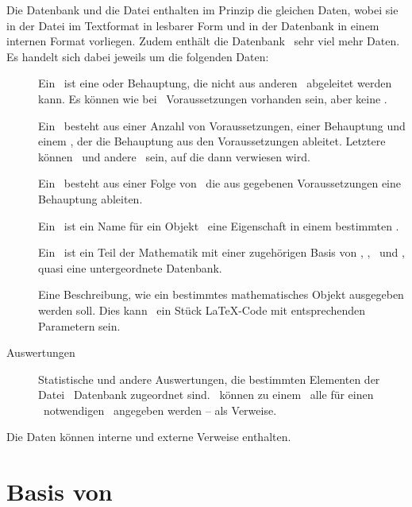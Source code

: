 Die Datenbank und die Datei enthalten im Prinzip die gleichen Daten, wobei sie in der Datei im Textformat in lesbarer Form und in der Datenbank in einem internen Format vorliegen.
Zudem enthält die Datenbank \textiAlg\ sehr viel mehr Daten. Es handelt sich dabei jeweils um die folgenden Daten:
\begin{description}
	\item[\Axiome]         \label{Daten:Axiom}
	Ein \Axiom\ ist eine \emph{\Aussage} oder Behauptung, die nicht aus anderen \Aussagen\ abgeleitet werden kann.
	Es können wie bei \Saetzen\ Voraussetzungen vorhanden sein, aber keine \Beweise.
	\item[\Saetze]          \label{Daten:Satz}
	Ein \Satz\ besteht aus einer Anzahl von Voraussetzungen, einer Behauptung und einem \Beweis, der die Behauptung aus den Voraussetzungen ableitet.
	Letztere können \Axiome\ und andere \Saetze\ sein, auf die dann verwiesen wird.
	\item[\Beweise]        \label{Daten:Beweis}
	Ein \Beweis\ besteht aus einer Folge von \Beweisschritten\, die aus gegebenen Voraussetzungen eine Behauptung ableiten.
	\item[\Fachbegriffe]   \label{Daten:Fachbegriff}
	Ein \Fachbegriff\ ist ein Name für ein Objekt \textbzw\ eine Eigenschaft in einem bestimmten \Fachgebiet.
	\item[\Fachgebiete]    \label{Daten:Fachgebiet}
	Ein \Fachgebiet\ ist ein Teil der Mathematik mit einer zugehörigen Basis von \Axiomen, \Saetzen, \Fachbegriffen\ und \Ausgabeschemata, quasi eine untergeordnete Datenbank.
	\item[\Ausgabeschemata] \label{Daten:Ausgabeschema}
	Eine Beschreibung, wie ein bestimmtes mathematisches Objekt ausgegeben werden soll.
	Dies kann \textzB\ ein Stück \LaTeX-Code mit entsprechenden Parametern sein.
	\item[Auswertungen]             \label{Daten:Auswertung}
	Statistische und andere Auswertungen, die bestimmten Elementen der Datei \textbzw\ Datenbank zugeordnet sind.
	\textZB\ können zu einem \Satz\ alle für einen \Beweis\ notwendigen \Axiome\ angegeben werden -- als Verweise.
\end{description}
Die Daten können interne und externe Verweise enthalten.

\section{Basis von \Beweisen}
\label{sec:BeweisBasis}

